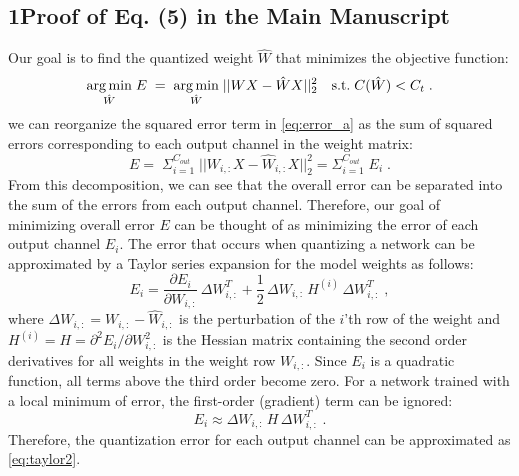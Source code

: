 \documentclass[letterpaper]{article} %
\begin{document}
\subsection*{1\quad Proof of Eq. (5) in the Main Manuscript}
Our goal is to find the quantized weight $\hat{W}$ that minimizes the objective function:
\begin{equation}
\underset{{\hat{W}}}{\arg\min} \; E \; = \; \underset{{\hat{W}}}{\arg\min} \; || W X - \hat{W} X ||_2^2 \quad \text{s.t.} \; C(\hat{W}) < C_t \;. \\
\label{eq:error_a}
\end{equation}
we can reorganize the squared error term in \cref{eq:error_a} as the sum of squared errors corresponding to each output channel in the weight matrix:
\begin{equation}
E = \; \Sigma_{i=1}^{C_{out}} \; ||W_{i,:} X - \hat{W}_{i,:} X||^2_2 = \Sigma_{i=1}^{C_{out}} \; E_i \;.
\label{eq:error2}
\end{equation}
From this decomposition, we can see that the overall error can be separated into the sum of the errors from each output channel. Therefore, our goal of minimizing overall error $E$ can be thought of as minimizing the error of each output channel $E_i$.
The error that occurs when quantizing a network can be approximated by a Taylor series expansion for the model weights as follows:
\begin{equation}
E_i = \frac{\partial E_i}{\partial W_{i,:}} \, \Delta W_{i,:}^T + \frac{1}{2} \, \Delta W_{i,:} \, H^{(i)} \, \Delta W_{i,:}^T \;,
\label{eq:taylor1}
\end{equation}
where $\Delta W_{i,:} = W_{i,:} - \hat{W}_{i,:}$ is the perturbation of the $i$'th row of the weight and $H^{(i)} = H = \partial^2 E_i / \partial W_{i,:}^2$ is the Hessian matrix containing the second order derivatives for all weights in the weight row $W_{i,:}$. Since $E_i$ is a quadratic function, all terms above the third order become zero. For a network trained with a local minimum of error, the first-order (gradient) term can be ignored:
\begin{equation}
E_i \approx \Delta W_{i,:} \, H \, \Delta W_{i,:}^T  \; .
\label{eq:taylor2}
\end{equation}
Therefore, the quantization error for each output channel can be approximated as \cref{eq:taylor2}.
\end{document}
